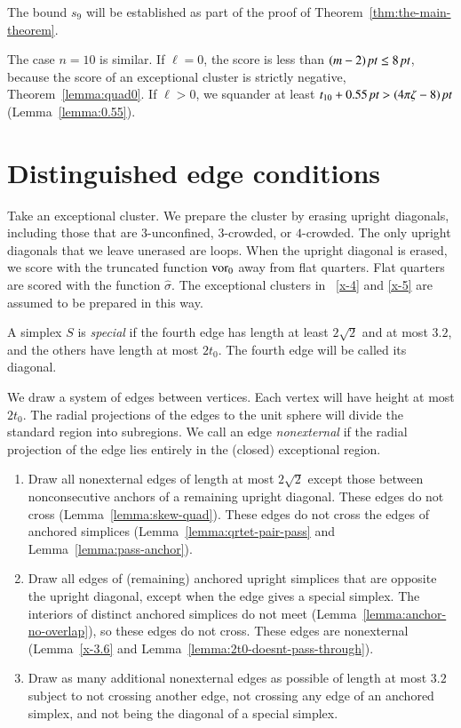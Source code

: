 The bound $s_9$ will be established as part of the proof of
Theorem~\ref{thm:the-main-theorem}.

The case $n=10$ is similar.  If $\ell=0$, the score is less than
    $(m-2)\,\hbox{\it pt}\le 8\,\hbox{\it pt}$,
because the score of an exceptional cluster is strictly negative,
Theorem~\ref{lemma:quad0}.  If $\ell>0$, we squander at least
    $t_{10}+ 0.55\,\hbox{\it pt} > (4\pi\zeta-8)\,\hbox{\it pt}$ (Lemma~\ref{lemma:0.55}).


\section{Distinguished edge conditions} %

Take an exceptional cluster.  We prepare the cluster by erasing
upright diagonals, including those that are $3$-unconfined,
$3$-crowded, or $4$-crowded.  The only upright diagonals that we
leave unerased are loops.  When the upright diagonal is erased, we
score with the truncated function $\operatorname{vor}_0$ away from flat
quarters.  Flat quarters are scored with the function
$\hat\sigma$. The exceptional clusters in \Chaps~\ref{x-4} and
\ref{x-5} are assumed to be prepared in this way.


A simplex $S$ is {\it special\/} if the fourth edge has length at
least $2\sqrt{2}$ and at most $3.2$, and the others have length at
most $2t_0$. The fourth edge will be called its diagonal.


We draw a system of edges between vertices.  Each vertex will have
height at most $2t_0$.  The radial projections of the edges to the
unit sphere will divide the standard region into subregions. We
call an edge {\it nonexternal\/} if the radial projection of the
edge lies entirely in the (closed) exceptional region.

\begin{enumerate}
\item Draw all nonexternal edges of length at most $2\sqrt{2}$
except those between nonconsecutive anchors of a remaining upright
diagonal. These edges do not cross (Lemma~\ref{lemma:skew-quad}).
These edges do not cross the edges of anchored simplices
(Lemma~\ref{lemma:qrtet-pair-pass} and
Lemma~\ref{lemma:pass-anchor}).

\item Draw all edges of (remaining) anchored upright simplices
that are opposite the upright diagonal, except when the edge gives
a special simplex. The interiors of distinct anchored simplices do
not meet (Lemma~\ref{lemma:anchor-no-overlap}), so these edges do
not cross. These edges are nonexternal (Lemma~\ref{x-3.6} and
Lemma~\ref{lemma:2t0-doesnt-pass-through}).

\item Draw as many additional nonexternal edges as possible of
length at most $3.2$ subject to not crossing another edge, not
crossing any edge of an anchored simplex, and not being the
diagonal of a special simplex.
\end{enumerate}

